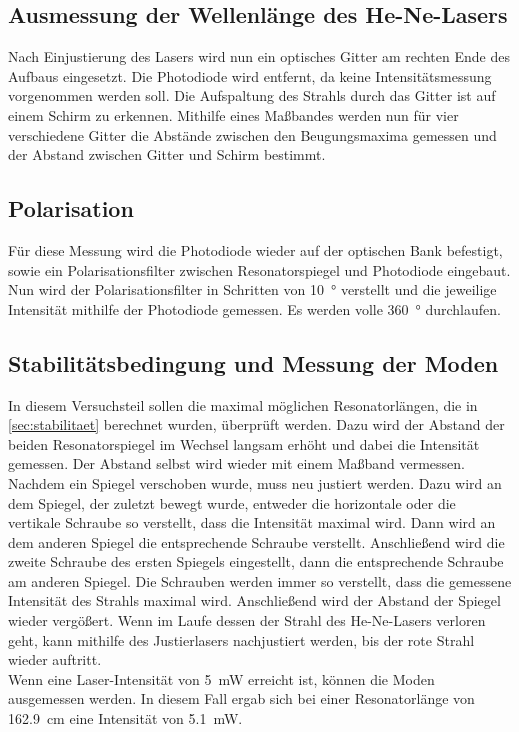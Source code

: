 \subsection{Ausmessung der Wellenlänge des He-Ne-Lasers}

    Nach Einjustierung des Lasers wird nun ein optisches Gitter am rechten Ende des Aufbaus eingesetzt.
    Die Photodiode wird entfernt, da keine Intensitätsmessung vorgenommen werden soll.
    Die Aufspaltung des Strahls durch das Gitter ist auf einem Schirm zu erkennen.
    Mithilfe eines Maßbandes werden nun für vier verschiedene Gitter die Abstände zwischen den Beugungsmaxima gemessen
    und der Abstand zwischen Gitter und Schirm bestimmt.


\subsection{Polarisation}

    Für diese Messung wird die Photodiode wieder auf der optischen Bank befestigt,
    sowie ein Polarisationsfilter zwischen Resonatorspiegel und Photodiode eingebaut.
    Nun wird der Polarisationsfilter in Schritten von \SI{10}{\degree} verstellt und die jeweilige Intensität mithilfe der Photodiode gemessen.
    Es werden volle \SI{360}{\degree} durchlaufen.


\subsection{Stabilitätsbedingung und Messung der Moden}

    In diesem Versuchsteil sollen die maximal möglichen Resonatorlängen,
    die in \autoref{sec:stabilitaet} berechnet wurden,
    überprüft werden.
    Dazu wird der Abstand der beiden Resonatorspiegel im Wechsel langsam erhöht und dabei die Intensität gemessen.
    Der Abstand selbst wird wieder mit einem Maßband vermessen.
    Nachdem ein Spiegel verschoben wurde,
    muss neu justiert werden.
    Dazu wird an dem Spiegel,
    der zuletzt bewegt wurde,
    entweder die horizontale oder die vertikale Schraube so verstellt,
    dass die Intensität maximal wird.
    Dann wird an dem anderen Spiegel die entsprechende Schraube verstellt.
    Anschließend wird die zweite Schraube des ersten Spiegels eingestellt,
    dann die entsprechende Schraube am anderen Spiegel.
    Die Schrauben werden immer so verstellt,
    dass die gemessene Intensität des Strahls maximal wird.
    Anschließend wird der Abstand der Spiegel wieder vergößert.
    Wenn im Laufe dessen der Strahl des He-Ne-Lasers verloren geht,
    kann mithilfe des Justierlasers nachjustiert werden,
    bis der rote Strahl wieder auftritt.\\
    Wenn eine Laser-Intensität von \SI{5}{\milli\watt} erreicht ist,
    können die Moden ausgemessen werden.
    In diesem Fall ergab sich bei einer Resonatorlänge von \SI{162.9}{\centi\meter} eine Intensität von \SI{5.1}{\milli\watt}.


